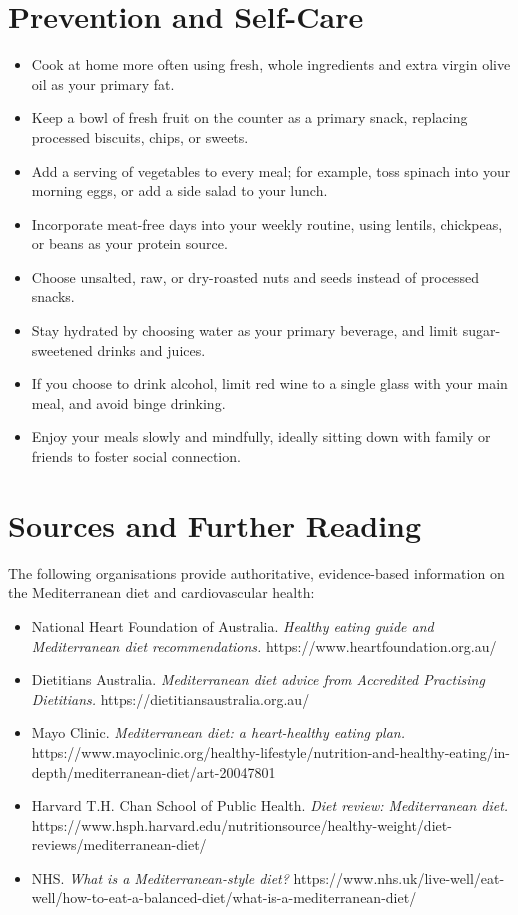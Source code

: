 \section*{Prevention and Self-Care}
\begin{itemize}
    \item Cook at home more often using fresh, whole ingredients and extra virgin olive oil as your primary fat.
    \item Keep a bowl of fresh fruit on the counter as a primary snack, replacing processed biscuits, chips, or sweets.
    \item Add a serving of vegetables to every meal; for example, toss spinach into your morning eggs, or add a side salad to your lunch.
    \item Incorporate meat-free days into your weekly routine, using lentils, chickpeas, or beans as your protein source.
    \item Choose unsalted, raw, or dry-roasted nuts and seeds instead of processed snacks.
    \item Stay hydrated by choosing water as your primary beverage, and limit sugar-sweetened drinks and juices.
    \item If you choose to drink alcohol, limit red wine to a single glass with your main meal, and avoid binge drinking.
    \item Enjoy your meals slowly and mindfully, ideally sitting down with family or friends to foster social connection.
\end{itemize}

\section*{Sources and Further Reading}
The following organisations provide authoritative, evidence-based information on the Mediterranean diet and cardiovascular health:
\begin{itemize}
    \item National Heart Foundation of Australia. \textit{Healthy eating guide and Mediterranean diet recommendations.} https://www.heartfoundation.org.au/
    \item Dietitians Australia. \textit{Mediterranean diet advice from Accredited Practising Dietitians.} https://dietitiansaustralia.org.au/
    \item Mayo Clinic. \textit{Mediterranean diet: a heart-healthy eating plan.} https://www.mayoclinic.org/healthy-lifestyle/nutrition-and-healthy-eating/in-depth/mediterranean-diet/art-20047801
    \item Harvard T.H. Chan School of Public Health. \textit{Diet review: Mediterranean diet.} https://www.hsph.harvard.edu/nutritionsource/healthy-weight/diet-reviews/mediterranean-diet/
    \item NHS. \textit{What is a Mediterranean-style diet?} https://www.nhs.uk/live-well/eat-well/how-to-eat-a-balanced-diet/what-is-a-mediterranean-diet/
\end{itemize}
